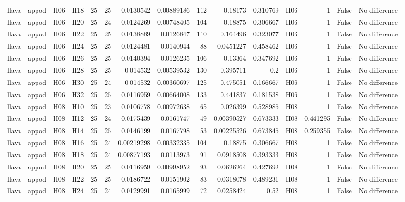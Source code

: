 \begin{longtable}{llllrrrrrrrlrrl}
llava & appod & H06 & H18 & 25 & 25 & 0.0130542 & 0.00889186 & 112 & 0.18173 & 0.310769 & H06 & 1 & False & No difference \\
llava & appod & H06 & H20 & 25 & 24 & 0.0124269 & 0.00748405 & 104 & 0.18875 & 0.306667 & H06 & 1 & False & No difference \\
llava & appod & H06 & H22 & 25 & 25 & 0.0138889 & 0.0126847 & 110 & 0.164496 & 0.323077 & H06 & 1 & False & No difference \\
llava & appod & H06 & H24 & 25 & 25 & 0.0124481 & 0.0140944 & 88 & 0.0451227 & 0.458462 & H06 & 1 & False & No difference \\
llava & appod & H06 & H26 & 25 & 25 & 0.0140394 & 0.0126235 & 106 & 0.13364 & 0.347692 & H06 & 1 & False & No difference \\
llava & appod & H06 & H28 & 25 & 25 & 0.014532 & 0.00539532 & 130 & 0.395711 & 0.2 & H06 & 1 & False & No difference \\
llava & appod & H06 & H30 & 25 & 24 & 0.014532 & 0.00360697 & 125 & 0.475051 & 0.166667 & H06 & 1 & False & No difference \\
llava & appod & H06 & H32 & 25 & 25 & 0.0116959 & 0.00664008 & 133 & 0.441837 & 0.181538 & H06 & 1 & False & No difference \\
llava & appod & H08 & H10 & 25 & 23 & 0.0106778 & 0.00972638 & 65 & 0.026399 & 0.528986 & H08 & 1 & False & No difference \\
llava & appod & H08 & H12 & 25 & 24 & 0.0175439 & 0.0161747 & 49 & 0.00390527 & 0.673333 & H08 & 0.441295 & False & No difference \\
llava & appod & H08 & H14 & 25 & 25 & 0.0146199 & 0.0167798 & 53 & 0.00225526 & 0.673846 & H08 & 0.259355 & False & No difference \\
llava & appod & H08 & H16 & 25 & 24 & 0.00219298 & 0.00332335 & 104 & 0.18875 & 0.306667 & H08 & 1 & False & No difference \\
llava & appod & H08 & H18 & 25 & 24 & 0.00877193 & 0.0113973 & 91 & 0.0918508 & 0.393333 & H08 & 1 & False & No difference \\
llava & appod & H08 & H20 & 25 & 25 & 0.0116959 & 0.00998952 & 93 & 0.0626264 & 0.427692 & H08 & 1 & False & No difference \\
llava & appod & H08 & H22 & 25 & 25 & 0.0186722 & 0.0151902 & 83 & 0.0318078 & 0.489231 & H08 & 1 & False & No difference \\
llava & appod & H08 & H24 & 25 & 24 & 0.0129991 & 0.0165999 & 72 & 0.0258424 & 0.52 & H08 & 1 & False & No difference \\

\end{longtable}
